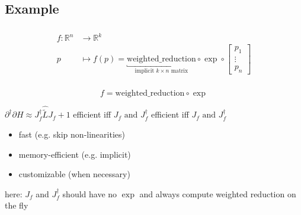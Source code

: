 \documentclass[aspectratio=169,xcolor=dvipsnames]{beamer}
\begin{document}
\subsection{Example}
\begin{frame}
	\frametitle{\insertsection}
	\framesubtitle{\insertsubsection}

	\begin{align*}
		f : \mathbb{R}^{n} &\rightarrow \mathbb{R}^k
		\\ p &\mapsto
		f(p) =
		\underbracket{\text{weighted\_reduction}}_{\text{implicit $k \times n$ matrix}}
		\circ
		\exp
		\circ
		\begin{bmatrix}
			p_{1} \\
			\vdots \\
			p_{n}
		\end{bmatrix}
	\end{align*}
\end{frame}

\begin{frame}
	\frametitle{\insertsection}
	\framesubtitle{\insertsubsection}

	\begin{equation*}
		f = \text{weighted\_reduction} \circ \exp
	\end{equation*}

	$\partial^\dagger \partial H\approx J_{f}^\dagger \widehat{\tilde{L}} J_{f} + 1$ efficient iff $J_f \text{ and } J^\dagger_f$ efficient iff $J_f \text{ and } J^\dagger_f$
	\begin{itemize}
		\item fast (e.g. skip non-linearities)
		\item memory-efficient (e.g. implicit)
		\item customizable (when necessary)
	\end{itemize}

	\pause
	\vspace{1em}
	here: $J_f$ and $J_f^\dagger$ should have no $\exp$ and always compute weighted reduction on the fly

\end{frame}
\end{document}

